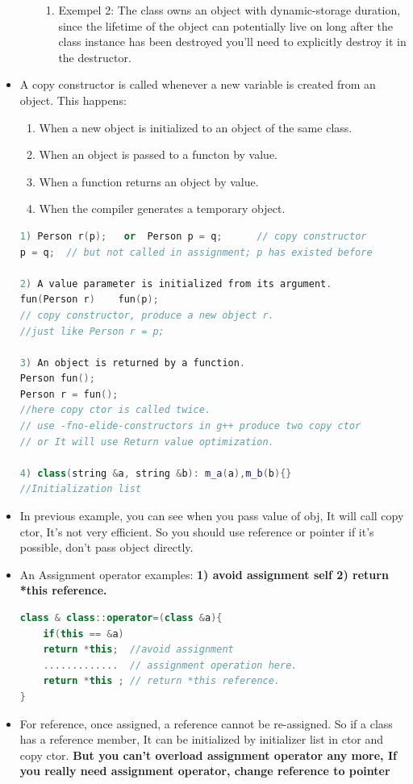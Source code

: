 \documentclass[a4paper,11pt,twoside]{book}
\begin{document}
\begin{itemize}
\begin{enumerate}
\begin{enumerate}
			\item Exempel 2: The class owns an object with dynamic-storage duration, since the lifetime of the object can potentially live on long after the class instance has been destroyed you'll need to explicitly destroy it in the destructor.
		\end{enumerate}
	\end{enumerate}
	
	
	\item A copy constructor is called whenever a new variable is created from an object. This happens:
	
	\begin{enumerate}
		\item When a new object is initialized to an object of the same class.
		\item When an object is passed to a functon by value.
		\item When a function returns an object by value.
		\item When the compiler generates a temporary object.
	\end{enumerate}
	
\begin{lstlisting}[frame=single, language=c++]
1) Person r(p);   or  Person p = q;      // copy constructor
p = q;  // but not called in assignment; p has existed before
	
2) A value parameter is initialized from its argument.
fun(Person r)    fun(p);
// copy constructor, produce a new object r.
//just like Person r = p;
	
3) An object is returned by a function.
Person fun();
Person r = fun();
//here copy ctor is called twice.
// use -fno-elide-constructors in g++ produce two copy ctor
// or It will use Return value optimization.
	
4) class(string &a, string &b): m_a(a),m_b(b){}
//Initialization list
\end{lstlisting}
	
	\item In previous example, you can see when you pass value of obj, It will call copy ctor, It's not very efficient. So you should use reference or pointer if it's possible, don't pass object directly.
	
	
	\item An Assignment operator examples: \textbf{1) avoid assignment self 2) return *this reference. }
\begin{lstlisting}[frame=single, language=c++]
class & class::operator=(class &a){
	if(this == &a)
	return *this;  //avoid assignment
	.............  // assignment operation here.
	return *this ; // return *this reference.
}
\end{lstlisting}
	
	\item For reference, once assigned, a reference cannot be re-assigned. So if a class has a reference member, It can be initialized by initializer list in ctor and copy ctor. \textbf{But you can't overload assignment operator any more, If you really need assignment operator, change reference to pointer}
\end{itemize}
\end{document}

